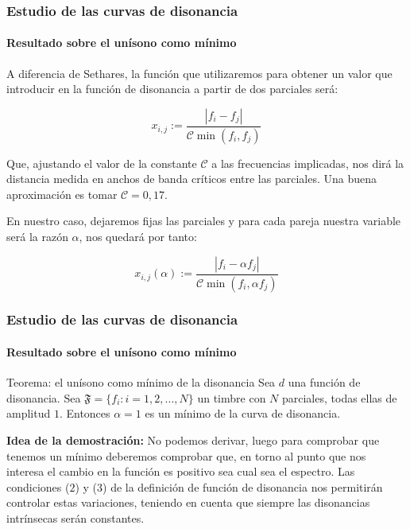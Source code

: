 \documentclass[12 pt]{beamer}
\begin{document}
\begin{frame}{23}
    \frametitle{Estudio de las curvas de disonancia}
    
    \framesubtitle{Resultado sobre el unísono como mínimo}
    
    A diferencia de Sethares, la función que utilizaremos para obtener un valor que introducir en la función de disonancia a partir de dos parciales será:
    
    \begin{equation*}
        x_{i,j} := \frac{|f_i - f_j|}{\mathcal{C} \min{(f_i, f_j)}}
    \end{equation*}
    
    Que, ajustando el valor de la constante $\mathcal{C}$ a las frecuencias implicadas, nos dirá la distancia medida en anchos de banda críticos entre las parciales. Una buena aproximación es tomar $\mathcal{C} = 0,17$.
    
    En nuestro caso, dejaremos fijas las parciales y para cada pareja nuestra variable será la razón $\alpha$, nos quedará por tanto:
    
    \begin{equation*}
        \boxed{
            x_{i,j}(\alpha) := \frac{|f_i - \alpha f_j|}{\mathcal{C}  \min{(f_i, \alpha f_j)}}
        }
    \end{equation*}
    
\end{frame}

\begin{frame}{24}
    \frametitle{Estudio de las curvas de disonancia}
    
    \framesubtitle{Resultado sobre el unísono como mínimo}
    
    \begin{alertblock}{Teorema: el unísono como mínimo de la disonancia}
    Sea $d$ una función de disonancia. Sea $\mathfrak{F} = \{ f_i : i = 1, 2,... , N\}$ un timbre con $N$ parciales, todas ellas de amplitud $1$. Entonces $\alpha = 1$ es un mínimo de la curva de disonancia.
    \end{alertblock}
    
    \textbf{Idea de la demostración:} No podemos derivar, luego para comprobar que tenemos un mínimo deberemos comprobar que, en torno al punto que nos interesa el cambio en la función es positivo sea cual sea el espectro. Las condiciones ($2$) y ($3$) de la definición de función de disonancia nos permitirán controlar estas variaciones, teniendo en cuenta que siempre las disonancias intrínsecas serán constantes.
\end{frame}
\end{document}
